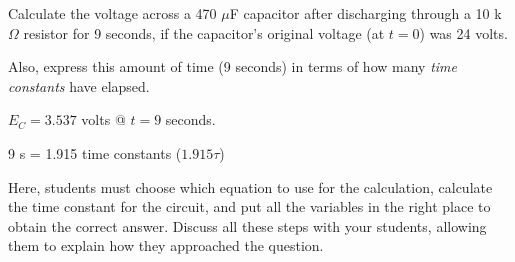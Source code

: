 

Calculate the voltage across a 470 $\mu$F capacitor after discharging through a 10 k$\Omega$ resistor for 9 seconds, if the capacitor's original voltage (at $t = 0$) was 24 volts.

Also, express this amount of time (9 seconds) in terms of how many {\it time constants} have elapsed.







$E_C = 3.537$ volts @ $t = 9$ seconds.

\vskip 10pt

9 s = 1.915 time constants ($1.915\tau$)







Here, students must choose which equation to use for the calculation, calculate the time constant for the circuit, and put all the variables in the right place to obtain the correct answer.  Discuss all these steps with your students, allowing them to explain how they approached the question.




